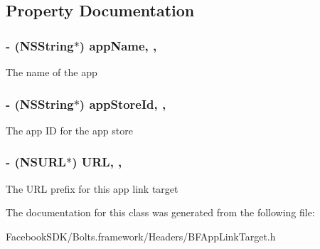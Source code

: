 \subsection{Property Documentation}
\hypertarget{interface_b_f_app_link_target_afc6ca12bba8d553ec5235d580e6e53d3}{
\subsubsection[{app\-Name}]{\setlength{\rightskip}{0pt plus 5cm}-\/ (N\-S\-String$\ast$) app\-Name\hspace{0.3cm}{\ttfamily [read]}, {\ttfamily [nonatomic]}, {\ttfamily [copy]}}}\label{interface_b_f_app_link_target_afc6ca12bba8d553ec5235d580e6e53d3}
The name of the app \hypertarget{interface_b_f_app_link_target_ac7750ffc69198f8bf2ddbed9046eca60}{
\subsubsection[{app\-Store\-Id}]{\setlength{\rightskip}{0pt plus 5cm}-\/ (N\-S\-String$\ast$) app\-Store\-Id\hspace{0.3cm}{\ttfamily [read]}, {\ttfamily [nonatomic]}, {\ttfamily [copy]}}}\label{interface_b_f_app_link_target_ac7750ffc69198f8bf2ddbed9046eca60}
The app I\-D for the app store \hypertarget{interface_b_f_app_link_target_a709dbbdd1a196272352283877f45783e}{
\subsubsection[{U\-R\-L}]{\setlength{\rightskip}{0pt plus 5cm}-\/ (N\-S\-U\-R\-L$\ast$) U\-R\-L\hspace{0.3cm}{\ttfamily [read]}, {\ttfamily [nonatomic]}, {\ttfamily [strong]}}}\label{interface_b_f_app_link_target_a709dbbdd1a196272352283877f45783e}
The U\-R\-L prefix for this app link target 

The documentation for this class was generated from the following file\-:\begin{DoxyCompactItemize}
\item 
Facebook\-S\-D\-K/\-Bolts.\-framework/\-Headers/B\-F\-App\-Link\-Target.\-h\end{DoxyCompactItemize}
